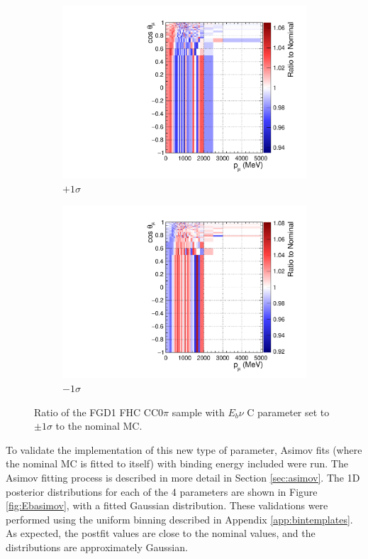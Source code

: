 \begin{figure}
\centering
\begin{subfigure}{.5\textwidth}
  \centering
  \includegraphics[width=0.95\linewidth]{figs/EbNuCP1Ratio}
  \caption{$+1\sigma$}\label{fig:EbratiosP1}
\end{subfigure}%
\begin{subfigure}{.5\textwidth}
  \centering
  \includegraphics[width=0.95\linewidth]{figs/EbNuCM1Ratio}
  \caption{$-1\sigma$}\label{fig:EbratiosM1}
\end{subfigure}
\caption{Ratio of the FGD1 FHC CC0$\pi$ sample with $E_{b}\nu$ C parameter set to $\pm 1\sigma$ to the nominal MC.}
\label{fig:Ebratios}
\end{figure}

To validate the implementation of this new type of parameter, Asimov fits\cite{asmv} (where the nominal MC is fitted to itself) with binding energy included were run. The Asimov fitting process is described in more detail in Section \ref{sec:asimov}. The 1D posterior distributions for each of the 4 parameters are shown in Figure \ref{fig:Ebasimov}, with a fitted Gaussian distribution. These validations were performed using the uniform binning described in Appendix \ref{app:bintemplates}. As expected, the postfit values are close to the nominal values, and the distributions are approximately Gaussian. 

